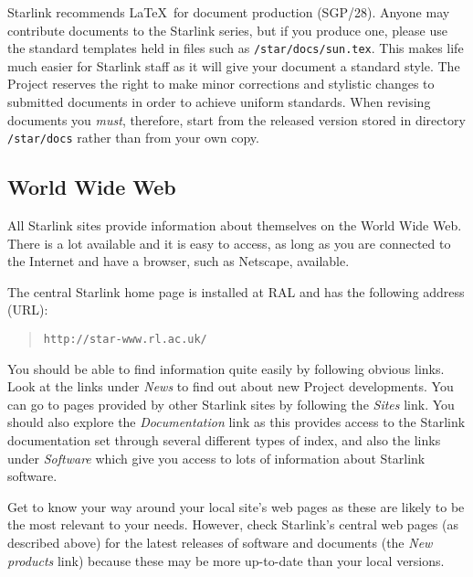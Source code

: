 \documentclass[twoside]{article}
\newcommand{\htmladdnormallink}[2]{#1}
\newcommand{\xref}[3]{#1}
\begin{document}
Starlink recommends \LaTeX\ for document production
(\xref{SGP/28}{sgp28}{}).
Anyone may contribute documents to the Starlink series, but if you produce one,
please use the standard templates held in files such as
{\tt /star/docs/sun.tex}.
This makes life much easier for Starlink staff as it will give your document
a standard style.
The Project reserves the right to make minor corrections and stylistic changes
to submitted documents in order to achieve uniform standards.
When revising documents you {\em must}, therefore, start from the released
version stored in directory {\tt /star/docs} rather than from your own copy.

\subsection{World Wide Web}

All
\htmladdnormallink{Starlink sites}{http://star-www.rl.ac.uk/sites.html}
provide information about themselves on the World Wide Web.
There is a lot available and it is easy to access, as long as you are
connected to the Internet and have a browser, such as Netscape, available.

The
\htmladdnormallink{central Starlink home page}{http://star-www.rl.ac.uk/}
is installed at RAL and has the following address (URL):
\begin{quote}
{\tt http://star-www.rl.ac.uk/}
\end{quote}
You should be able to find information quite easily by following obvious
links.
Look at the links under {\em News}\/ to find out about new
Project developments.
You can go to pages provided by other Starlink sites by following the
{\em \htmladdnormallink{Sites}{http://star-www.rl.ac.uk/sites.html}}\/ link.
You should also explore the
{\em \htmladdnormallink{Documentation}
{http://star-www.rl.ac.uk/docs.html}}\/
link as this provides access to the Starlink documentation set through
several different types of index, and also the links under {\em Software}\/
which give you access to lots of information about Starlink software.

Get to know your way around your local site's web pages as these are likely to
be the most relevant to your needs.
However, check Starlink's central web pages (as described above) for the
latest releases of software and documents (the
{\em \htmladdnormallink{New products}
{http://star-www.rl.ac.uk/\~{}cac/publicity/new_products.html}}\/
link)
because these may be more up-to-date than your local versions.
\end{document}
